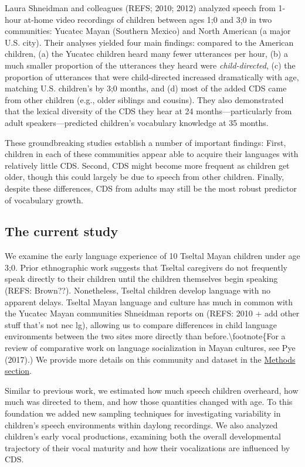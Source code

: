 \documentclass[floatsintext,man]{apa6}
\theoremstyle{definition}
\theoremstyle{definition}
\theoremstyle{definition}
\theoremstyle{remark}
\begin{document}
Laura Shneidman and colleagues (REFS; 2010; 2012) analyzed speech from
1-hour at-home video recordings of children between ages 1;0 and 3;0 in
two communities: Yucatec Mayan (Southern Mexico) and North American (a
major U.S. city). Their analyses yielded four main findings: compared to
the American children, (a) the Yucatec children heard many fewer
utterances per hour, (b) a much smaller proportion of the utterances
they heard were \emph{child-directed}, (c) the proportion of utterances
that were child-directed increased dramatically with age, matching U.S.
children's by 3;0 months, and (d) most of the added CDS came from other
children (e.g., older siblings and cousins). They also demonstrated that
the lexical diversity of the CDS they hear at 24 months---particularly
from adult speakers---predicted children's vocabulary knowledge at 35
months.

These groundbreaking studies establish a number of important findings:
First, children in each of these communities appear able to acquire
their languages with relatively little CDS. Second, CDS might become
more frequent as children get older, though this could largely be due to
speech from other children. Finally, despite these differences, CDS from
adults may still be the most robust predictor of vocabulary growth.

\subsection{The current study}\label{intro-currentstudy}

We examine the early language experience of 10 Tseltal Mayan children
under age 3;0. Prior ethnographic work suggests that Tseltal caregivers
do not frequently speak directly to their children until the children
themselves begin speaking (REFS: Brown??). Nonetheless, Tseltal children
develop language with no apparent delays. Tseltal Mayan language and
culture has much in common with the Yucatec Mayan communities Shneidman
reports on (REFS: 2010 + add other stuff that's not nec lg), allowing us
to compare differences in child language environments between the two
sites more directly than before.\textbackslash{}footnote\{For a review
of comparative work on language socialization in Mayan cultures, see Pye
(2017).) We provide more details on this community and dataset in the
\protect\hyperlink{methods}{Methods section}.

Similar to previous work, we estimated how much speech children
overheard, how much was directed to them, and how those quantities
changed with age. To this foundation we added new sampling techniques
for investigating variability in children's speech environments within
daylong recordings. We also analyzed children's early vocal productions,
examining both the overall developmental trajectory of their vocal
maturity and how their vocalizations are influenced by CDS.
\end{document}
